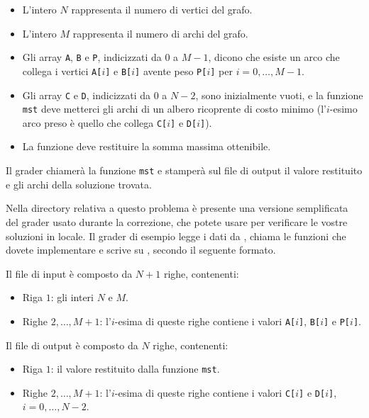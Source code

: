 \begin{itemize}[nolistsep]
  \item L'intero $N$ rappresenta il numero di vertici del grafo.
  \item L'intero $M$ rappresenta il numero di archi del grafo.
  \item Gli array \texttt{A}, \texttt{B} e \texttt{P}, indicizzati da $0$ a $M-1$, dicono che esiste un arco che collega i vertici \texttt{A[$i$]} e \texttt{B[$i$]} avente peso \texttt{P[$i$]} per $i = 0, \ldots, M-1$.
  \item Gli array \texttt{C} e \texttt{D}, indicizzati da $0$ a $N-2$, sono inizialmente vuoti, e la funzione \texttt{mst} deve metterci gli archi di un albero ricoprente di costo minimo (l'$i$-esimo arco preso è quello che collega \texttt{C[$i$]} e \texttt{D[$i$]}).
  \item La funzione deve restituire la somma massima ottenibile.
\end{itemize}

\medskip

Il grader chiamerà la funzione \texttt{mst} e stamperà sul file di output il valore restituito e gli archi della soluzione trovata.



\Grader
Nella directory relativa a questo problema è presente una versione semplificata del grader usato durante la correzione, che potete usare per verificare le vostre soluzioni in locale. Il grader di esempio legge i dati da , chiama le funzioni che dovete implementare e scrive su \outputfile{}, secondo il seguente formato.

Il file di input è composto da  $N+1$ righe, contenenti:
\begin{itemize}[nolistsep,itemsep=2mm]
\item Riga $1$: gli interi $N$ e $M$.
\item Righe $2, \ldots, M+1$: l'$i$-esima di queste righe contiene i valori \texttt{A[$i$]}, \texttt{B[$i$]} e \texttt{P[$i$]}.
\end{itemize}

Il file di output è composto da $N$ righe, contenenti:
\begin{itemize}[nolistsep,itemsep=2mm]
\item Riga $1$: il valore restituito dalla funzione \texttt{mst}.
\item Righe $2, \ldots, M+1$: l'$i$-esima di queste righe contiene i valori \texttt{C[$i$]} e \texttt{D[$i$]}, $i=0, \ldots, N-2$.
\end{itemize}

